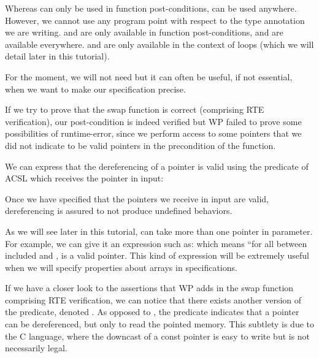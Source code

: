 Whereas  can only be used in function
post-conditions,  can be used anywhere.
However, we cannot use any program point with respect to the type
annotation we are writing.  and  are only
available in function post-conditions,  and 
are available everywhere.  and 
are only available in the context of loops (which we will detail later
in this tutorial).



For the moment, we will not need  but it can
often be useful, if not essential, when we want to make our
specification precise.





If we try to prove that the swap function is correct (comprising RTE
verification), our post-condition is indeed verified but WP failed to
prove some possibilities of runtime-error, since we perform access to
some pointers that we did not indicate to be valid pointers in the
precondition of the function.

We can express that the dereferencing of a pointer is valid using the
 predicate of ACSL which receives the
pointer in input:






Once we have specified that the pointers we receive in input are valid,
dereferencing is assured to not produce undefined behaviors.



As we will see later in this tutorial, 
can take more than one pointer in parameter. For example, we can give it
an expression such as:  which means
``for all  between included  and ,
 is a valid pointer. This kind of expression will be
extremely useful when we will specify properties about arrays in
specifications.



If we have a closer look to the assertions that WP adds in the swap
function comprising RTE verification, we can notice that there exists
another version of the  predicate, denoted
. As opposed to , the
predicate  indicates that a pointer
can be dereferenced, but only to read the pointed memory. This subtlety
is due to the C language, where the downcast of a const pointer is easy
to write but is not necessarily legal.



